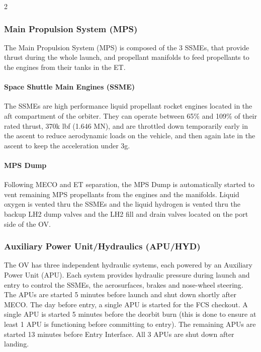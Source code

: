 \documentclass[Space_Shuttle_Vessel_Manual.tex]{subfiles}
\begin{document}
\begin{multicols*}{2}
\subsubsection{Main Propulsion System (MPS)}
The Main Propulsion System (MPS) is composed of the 3 SSMEs, that provide thrust during the whole launch, and propellant manifolds to feed propellants to the engines from their tanks in the ET.
\paragraph{Space Shuttle Main Engines (SSME)}
The SSMEs are high performance liquid propellant rocket engines located in the aft compartment of the orbiter. They can operate between 65\% and 109\% of their rated thrust, 370k lbf (1.646 MN), and are throttled down temporarily early in the ascent to reduce aerodynamic loads on the vehicle, and then again late in the ascent to keep the acceleration under 3g.
\paragraph{MPS Dump}
Following MECO and ET separation, the MPS Dump is automatically started to vent remaining MPS propellants from the engines and the manifolds. Liquid oxygen is vented thru the SSMEs and the liquid hydrogen is vented thru the backup LH2 dump valves and the LH2 fill and drain valves located on the port side of the OV.


\subsubsection{Auxiliary Power Unit/Hydraulics (APU/HYD)}
The OV has three independent hydraulic systems, each powered by an Auxiliary Power Unit (APU). Each system provides hydraulic pressure during launch and entry to control the SSMEs, the aerosurfaces, brakes and nose-wheel steering.\\
The APUs are started 5 minutes before launch and shut down shortly after MECO. The day before entry, a single APU is started for the FCS checkout. A single APU is started 5 minutes before the deorbit burn (this is done to ensure at least 1 APU is functioning before committing to entry). The remaining APUs are started 13 minutes before Entry Interface. All 3 APUs are shut down after landing.

\end{multicols*}
\end{document}
